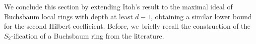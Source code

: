 \documentclass[11pt]{amsart}
\theoremstyle{plain}
\newtheorem{theorem}{Theorem}[section]
\newcommand{\wt}{\widetilde}
\newcommand{\type}{\operatorname{type}}
\theoremstyle{plain}
\begin{document}












We conclude this section by extending Itoh’s result \cite{itoh1} to the maximal ideal of Buchsbaum local rings with depth at least $d-1$, obtaining a similar lower bound for the second Hilbert coefficient. Before, we briefly recall the construction of the  $S_{2}$-ification of a Buchsbaum ring from the literature. 
\end{document}
